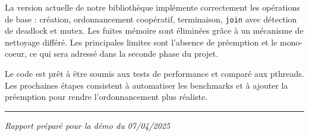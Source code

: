 \documentclass[12pt,a4paper]{article}
\begin{document}
La version actuelle de notre bibliothèque implémente correctement les opérations de base : création, ordonnancement coopératif, terminaison, \texttt{join} avec détection de deadlock et mutex. Les fuites mémoire sont éliminées grâce à un mécanisme de nettoyage différé. Les principales limites sont l’absence de préemption et le mono-coeur, ce qui sera adressé dans la seconde phase du projet.

Le code est prêt à être soumis aux tests de performance et comparé aux pthreads. Les prochaines étapes consistent à automatiser les benchmarks et à ajouter la préemption pour rendre l’ordonnancement plus réaliste.

\vspace{1cm}
\hrule
\vspace{0.5cm}
\emph{Rapport préparé pour la démo du 07/04/2025}
\end{document}
